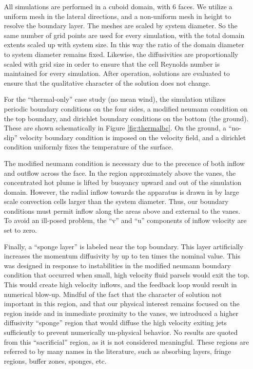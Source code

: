 %
%

All simulations are performed in a cuboid domain, with 6 faces. We
utilize a uniform mesh in the lateral directions, and a non-uniform mesh
in height to resolve the boundary layer. The meshes are scaled by system
diameter. So the same number of grid points are used for every
simulation, with the total domain extents scaled up with system size. In
this way the ratio of the domain diameter to system diameter remains
fixed. Likewise, the diffusivities are proportionally scaled with grid
size in order to ensure that the cell Reynolds number is maintained for
every simulation. After operation, solutions are evaluated to ensure
that the qualitative character of the solution does not change. 


%
%

For the ``thermal-only'' case study (no mean wind), the simulation
utilizes periodic boundary conditions on the four sides, a modified
neumann condition on the top boundary, and dirichlet boundary conditions
on the bottom (the ground). These are shown schematically in Figure
\ref{fig:thermalbc}. On the ground, a ``no-slip'' velocity boundary
condition is imposed on the velocity field, and a dirichlet condition
uniformly fixes the temperature of the surface. 

The modified neumann condition is necessary due to the precence of both
inflow and outflow across the face. In the region approximately above
the vanes, the concentrated hot plume is lifted by buoyancy
upward and out of the simulation domain. However, the radial inflow
towards the apparatus is drawn in by large scale convection cells larger
than the system diameter. Thus, our boundary conditions must permit
inflow along the areas above and external to the vanes. To avoid an
ill-posed problem, the ``v'' and ``u'' components of inflow velocity are
set to zero.  

Finally, a ``sponge layer'' is labeled near the top boundary. 
This layer
artificially increases the momentum diffusivity by up to ten times the nominal
value. This was designed in response to instabilities in the modified
neumann boundary condition that occurred when small, high velocity fluid
parsels would exit the top. This would create high velocity inflows, and
the feedback loop would result in numerical blow-up. Mindful of the fact
that the character of solution not important in this region, and that
our physical interest remains focused on the region inside and
in immediate proximity to the vanes, we introduced a higher diffusivity
``sponge'' region that would diffuse the high velocity exiting jets
sufficiently to prevent numerically un-physical behavior. No results are
quoted from this ``sacrificial'' region, as it is not considered
meaningful. These regions are referred to by many names in the
literature\cite{doi:10.1146/annurev.fluid.36.050802.121930}, such as
absorbing layers, fringe regions, buffer zones, sponges, etc.

